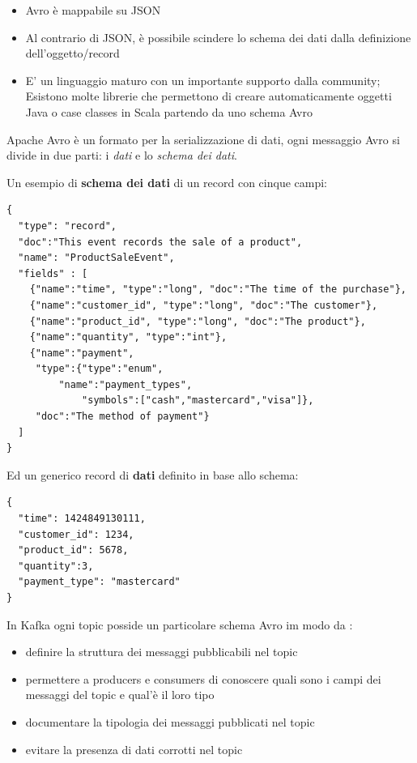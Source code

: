 \documentclass[]{article}
\providecommand{\tightlist}{%
  \setlength{\itemsep}{0pt}\setlength{\parskip}{0pt}}
\begin{document}
\begin{itemize}
\tightlist
\item
  Avro è mappabile su JSON
\item
  Al contrario di JSON, è possibile scindere lo schema dei dati dalla
  definizione dell'oggetto/record
\item
  E' un linguaggio maturo con un importante supporto dalla community;
  Esistono molte librerie che permettono di creare automaticamente
  oggetti Java o case classes in Scala partendo da uno schema Avro
\end{itemize}

Apache Avro è un formato per la serializzazione di dati, ogni messaggio
Avro si divide in due parti: i \emph{dati} e lo \emph{schema dei dati}.

Un esempio di \textbf{schema dei dati} di un record con cinque campi:
\small

\begin{verbatim}
{
  "type": "record",
  "doc":"This event records the sale of a product",
  "name": "ProductSaleEvent",
  "fields" : [
    {"name":"time", "type":"long", "doc":"The time of the purchase"},
    {"name":"customer_id", "type":"long", "doc":"The customer"},
    {"name":"product_id", "type":"long", "doc":"The product"},
    {"name":"quantity", "type":"int"},
    {"name":"payment",
     "type":{"type":"enum",
         "name":"payment_types",
             "symbols":["cash","mastercard","visa"]},
     "doc":"The method of payment"}
  ]
}
\end{verbatim}

\normalsize
\newpage
Ed un generico record di \textbf{dati} definito in base allo schema:

\small

\begin{verbatim}
{  
  "time": 1424849130111,     
  "customer_id": 1234,  
  "product_id": 5678,  
  "quantity":3,  
  "payment_type": "mastercard"  
}
\end{verbatim}

\normalsize

In Kafka ogni topic posside un particolare schema Avro im modo da :

\begin{itemize}
\tightlist
\item
  definire la struttura dei messaggi pubblicabili nel topic
\item
  permettere a producers e consumers di conoscere quali sono i campi dei
  messaggi del topic e qual'è il loro tipo
\item
  documentare la tipologia dei messaggi pubblicati nel topic
\item
  evitare la presenza di dati corrotti nel topic
\end{itemize}
\end{document}
